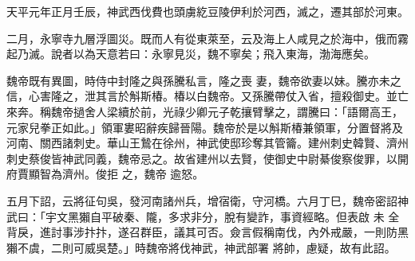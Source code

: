 
\begin{pinyinscope}

 天平元年正月壬辰，神武西伐費也頭虜紇豆陵伊利於河西，滅之，遷其部於河東。



 二月，永寧寺九層浮圖災。既而人有從東萊至，云及海上人咸見之於海中，俄而霧起乃滅。說者以為天意若曰：永寧見災，魏不寧矣；飛入東海，渤海應矣。



 魏帝既有異圖，時侍中封隆之與孫騰私言，隆之喪
 妻，魏帝欲妻以妹。騰亦未之信，心害隆之，泄其言於斛斯椿。椿以白魏帝。又孫騰帶仗入省，擅殺御史。並亡來奔。稱魏帝撾舍人梁續於前，光祿少卿元子乾攘臂擊之，謂騰曰：「語爾高王，元家兒拳正如此。」領軍婁昭辭疾歸晉陽。魏帝於是以斛斯椿兼領軍，分置督將及河南、關西諸刺史。華山王鷙在徐州，神武使邸珍奪其管籥。建州刺史韓賢、濟州刺史蔡俊皆神武同義，魏帝忌之。故省建州以去賢，使御史中尉綦俊察俊罪，以開府賈顯智為濟州。俊拒
 之，魏帝
 逾怒。



 五月下詔，云將征句吳，發河南諸州兵，增宿衛，守河橋。六月丁巳，魏帝密詔神武曰：「宇文黑獺自平破秦、隴，多求非分，脫有變詐，事資經略。但表啟
 未
 全背戾，進討事涉抃抃，遂召群臣，議其可否。僉言假稱南伐，內外戒嚴，一則防黑獺不虞，二則可威吳楚。」時魏帝將伐神武，神武部署
 將帥，慮疑，故有此詔。




\end{pinyinscope}
